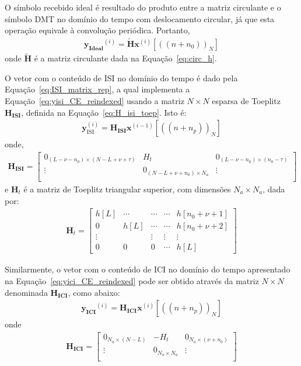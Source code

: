 O símbolo recebido ideal é resultado do produto entre a matriz circulante e o símbolo DMT no domínio do tempo com deslocamento circular, já que esta operação equivale à convolução periódica. Portanto,
\begin{align}
\mathbf{y_\text{Ideal}}^{(i)} = \mathbf{ \tilde{H} } \mathbf{x}^{(i)}[((n + n_0))_N] 
\end{align}
onde $\mathbf{ \tilde{H} }$ é a matriz circulante dada na Equação~\ref{eq:circ_h}.

O vetor com o conteúdo de ISI no domínio do tempo é dado pela Equação~\ref{eq:ISI_matrix_rep}, a qual implementa a Equação~\ref{eq:yisi_CE_reindexed} usando a matriz $N \times N$ esparsa de Toeplitz $\mathbf{ H_\text{ISI}}$, definida na Equação~\ref{eq:H_isi_toep}. Isto é:
\begin{align}
\mathbf{y}_\text{ISI}^{(i)} = \mathbf{ H_\text{ISI}} \mathbf{x}^{(i-1)}[((n + n_p))_N] 
\label{eq:ISI_matrix_rep}
\end{align}
onde,
\begin{align}
\mathbf{ H_\text{ISI}} =
\left[
\begin{array}{ccc}
0_{ (L-\nu - n_0) \times \left( N -L + \nu + \tau\right) }  & H_t & 0_{ (L-\nu - n_0) \times \left( n_0 - \tau \right)} \\
\vdots & 0_{ (N - L + \nu + n_0) \times N_a } & \vdots\\
\end{array}
\right]
\label{eq:H_isi_toep}
\end{align}
e $\mathbf{H}_t$ é a matriz de Toeplitz triangular superior, com dimensões $N_a \times N_a$, dada por:
\begin{align}
\mathbf{H}_t
=
\left[
\begin{array}{ccccccc}
h[L] & \cdots &\cdots & \cdots & h[n_0 + \nu +1] \\
0 & h[L] & \cdots &\cdots & h[n_0 + \nu +2]\\
\vdots & & \vdots & \vdots & \vdots \\
0 & 0 & 0 & \cdots & h[L] 
\end{array}
\right]
\label{eq:H_isi_t}
\end{align} 

Similarmente, o vetor com o conteúdo de ICI no domínio do tempo apresentado na Equação~\ref{eq:yici_CE_reindexed} pode ser obtido através da matriz $N \times N$ denominada $\mathbf{ H_\text{ICI}}$, como abaixo:
\begin{align}
\mathbf{y_\text{ICI}}^{(i)} = \mathbf{ H_\text{ICI}} \mathbf{x}^{(i)}[((n + n_p))_N] 
\label{eq:ICI_matrix_rep_vec}
\end{align}
onde
\begin{align}
\mathbf{ H_\text{ICI}} = 
\left[
\begin{array}{ccc}
0_{N_a \times \left( N - L \right) }  & - H_t & 0_{N_a \times \left( \nu + n_0\right) }\\
\vdots & 0_{ N_a\times N_a } & \vdots\\
\end{array}
\right]
\label{eq:H_ici_toep}
\end{align}
